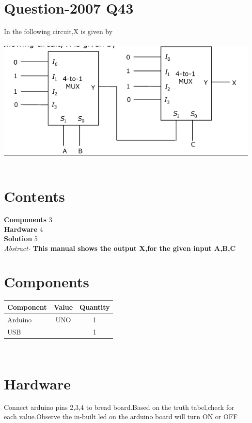 \documentclass[10pt]{report}
\begin{document}
\begin{multicols}{2} 
\section{Question-2007  Q43}
In the following circuit,X is given by \\
\
\includegraphics[scale=0.40]{mux.png}\\
\
\section{Contents}
\raggedright
\textbf{Components}\hspace{4.35cm} 3
\\\textbf{Hardware}\hspace{4.78cm}   4
\\\textbf{Solution}
\hspace{4.95cm}   5\\
\vspace{1cm}
\textit{Abstract-}
\textbf{This manual shows the output X,for the given input A,B,C}
\section{Components}
\centering
\begin{tabular}{|l|c|c|}
\hline
Component & Value & Quantity\\
\hline
Arduino & UNO & 1\\
\hline
USB & & 1\\
\hline
\end{tabular}\\
\section{Hardware}
\raggedright Connect arduino pins 2,3,4 to bread board.Based on the truth tabel,check for each value.Observe the in-built led on the arduino board will turn ON or OFF \\
\centering

\end{multicols}
\end{document}
